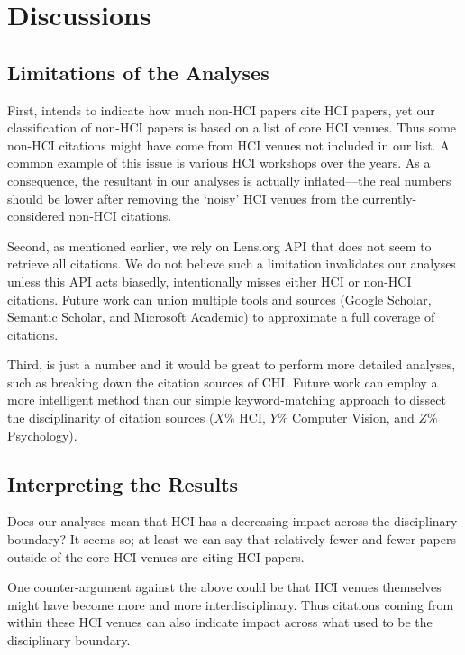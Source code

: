 \section{Discussions}

\subsection{Limitations of the Analyses}

First, \xin intends to indicate how much non-HCI papers cite HCI papers, yet our classification of non-HCI papers is based on a list of core HCI venues. Thus some non-HCI citations might have come from HCI venues not included in our list. A common example of this issue is various HCI workshops over the years.
As a consequence, the resultant \xin in our analyses is actually inflated---the real numbers should be lower after removing the `noisy' HCI venues from the currently-considered non-HCI citations.

Second, as mentioned earlier, we rely on Lens.org API \cite{TheLensF23:online} that does not seem to retrieve all citations. 
We do not believe such a limitation invalidates our analyses unless this API acts biasedly, \ie intentionally misses either HCI or non-HCI citations.
Future work can union multiple tools and sources (\eg Google Scholar, Semantic Scholar, and Microsoft Academic) to approximate a full coverage of citations.

Third, \xin is just a number and it would be great to perform more detailed analyses, such as breaking down the citation sources of CHI.
Future work can employ a more intelligent method than our simple keyword-matching approach to dissect the disciplinarity of citation sources (\eg $X\%$ HCI, $Y\%$ Computer Vision, and $Z\%$ Psychology).

\subsection{Interpreting the Results}

Does our \xin analyses mean that HCI has a decreasing impact across the disciplinary boundary?
It seems so; at least we can say that relatively fewer and fewer papers outside of the core HCI venues are citing HCI papers.

One counter-argument against the above could be that HCI venues themselves might have become more and more interdisciplinary. 
Thus citations coming from within these HCI venues can also indicate impact across what used to be the disciplinary boundary.

